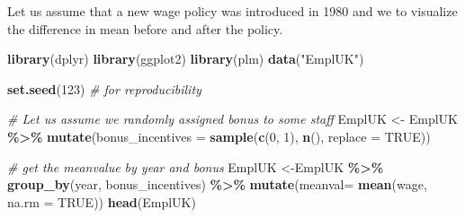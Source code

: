 \documentclass[
]{article}
\newenvironment{Shaded}{\begin{snugshade}}{\end{snugshade}}
\newcommand{\AttributeTok}[1]{\textcolor[rgb]{0.13,0.29,0.53}{#1}}
\newcommand{\CommentTok}[1]{\textcolor[rgb]{0.56,0.35,0.01}{\textit{#1}}}
\newcommand{\ConstantTok}[1]{\textcolor[rgb]{0.56,0.35,0.01}{#1}}
\newcommand{\DecValTok}[1]{\textcolor[rgb]{0.00,0.00,0.81}{#1}}
\newcommand{\FunctionTok}[1]{\textcolor[rgb]{0.13,0.29,0.53}{\textbf{#1}}}
\newcommand{\NormalTok}[1]{#1}
\newcommand{\OtherTok}[1]{\textcolor[rgb]{0.56,0.35,0.01}{#1}}
\newcommand{\SpecialCharTok}[1]{\textcolor[rgb]{0.81,0.36,0.00}{\textbf{#1}}}
\newcommand{\StringTok}[1]{\textcolor[rgb]{0.31,0.60,0.02}{#1}}
\begin{document}
Let us assume that a new wage policy was introduced in 1980 and we to
visualize the difference in mean before and after the policy.

\begin{Shaded}
\begin{Highlighting}[]
\FunctionTok{library}\NormalTok{(dplyr)}
\FunctionTok{library}\NormalTok{(ggplot2)}
\FunctionTok{library}\NormalTok{(plm)}
\FunctionTok{data}\NormalTok{(}\StringTok{"EmplUK"}\NormalTok{)}


\FunctionTok{set.seed}\NormalTok{(}\DecValTok{123}\NormalTok{) }\CommentTok{\# for reproducibility}
 

\CommentTok{\# Let us assume we randomly assigned bonus to some staff}
\NormalTok{EmplUK }\OtherTok{\textless{}{-}}\NormalTok{ EmplUK }\SpecialCharTok{\%\textgreater{}\%} 
  \FunctionTok{mutate}\NormalTok{(}\AttributeTok{bonus\_incentives =} \FunctionTok{sample}\NormalTok{(}\FunctionTok{c}\NormalTok{(}\DecValTok{0}\NormalTok{, }\DecValTok{1}\NormalTok{), }\FunctionTok{n}\NormalTok{(), }\AttributeTok{replace =} \ConstantTok{TRUE}\NormalTok{))}


\CommentTok{\# get the meanvalue by year and bonus}
\NormalTok{EmplUK }\OtherTok{\textless{}{-}}\NormalTok{EmplUK }\SpecialCharTok{\%\textgreater{}\%} \FunctionTok{group\_by}\NormalTok{(year, bonus\_incentives) }\SpecialCharTok{\%\textgreater{}\%} \FunctionTok{mutate}\NormalTok{(}\AttributeTok{meanval=} \FunctionTok{mean}\NormalTok{(wage, }\AttributeTok{na.rm =} \ConstantTok{TRUE}\NormalTok{))}
\FunctionTok{head}\NormalTok{(EmplUK)}
\end{Highlighting}
\end{Shaded}
\end{document}
